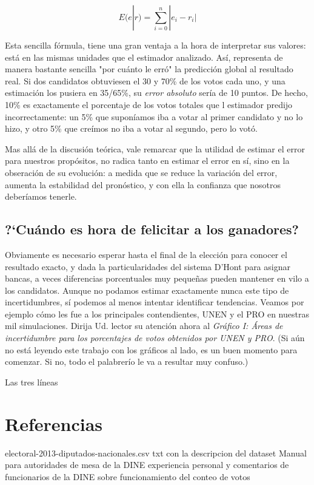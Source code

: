 \documentclass[12pt, a4paper]{article}
\begin{document}
$$ E(e|r) = \sum\limits_{i=0}^{n} | e_{i} - r_{i} | $$

Esta sencilla f\'ormula, tiene una gran ventaja a la hora de interpretar sus valores: est\'a en las mismas unidades que el estimador analizado. As\'i, representa de manera bastante sencilla "por cu\'anto le err\'o" la predicci\'on global al resultado real. Si dos candidatos obtuviesen el 30 y 70\% de los votos cada uno, y una estimaci\'on los pusiera en 35/65\%, su \emph{error absoluto} ser\'ia de 10 puntos. De hecho, 10\% es exactamente el porcentaje de los votos totales que l estimador predijo incorrectamente: un 5\% que supon\'iamos iba a votar al primer candidato y no lo hizo, y otro 5\% que cre\'imos no iba a votar al segundo, pero lo vot\'o.

Mas all\'a de la discusi\'on te\'orica, vale remarcar que la utilidad de estimar el error para nuestros prop\'ositos, no radica tanto en estimar el error en s\'i, sino en la obseraci\'on de su evoluci\'on: a medida que se reduce la variaci\'on del error, aumenta la estabilidad del pron\'ostico, y con ella la confianza que nosotros deber\'iamos tenerle.

\subsection{?`Cu\'ando es hora de felicitar a los ganadores?}

Obviamente es necesario esperar hasta el final de la elecci\'on para conocer el resultado exacto, y dada la particularidades del sistema D'Hont para asignar bancas, a veces diferencias porcentuales muy peque\~nas pueden mantener en vilo a los candidatos. Aunque no podamos estimar exactamente nunca este tipo de incertidumbres, s\'i podemos al menos intentar identificar tendencias. Veamos por ejemplo c\'omo les fue a los principales contendientes, UNEN y el PRO en nuestras mil simulaciones. Dirija Ud. lector su atenci\'on ahora al \textit{Gr\'afico I: \'Areas de incertidumbre para los porcentajes de votos obtenidos por UNEN y PRO}. (Si a\'un no est\'a leyendo este trabajo con los gr\'aficos al lado, es un buen momento para comenzar. Si no, todo el palabrer\'io le va a resultar muy confuso.)


Las tres l\'ineas 



\section{Referencias}
electoral-2013-diputados-nacionales.csv
txt con la descripcion del dataset
Manual para autoridades de mesa de la DINE
experiencia personal y comentarios de funcionarios de la DINE sobre funcionamiento del conteo de votos
\end{document}
